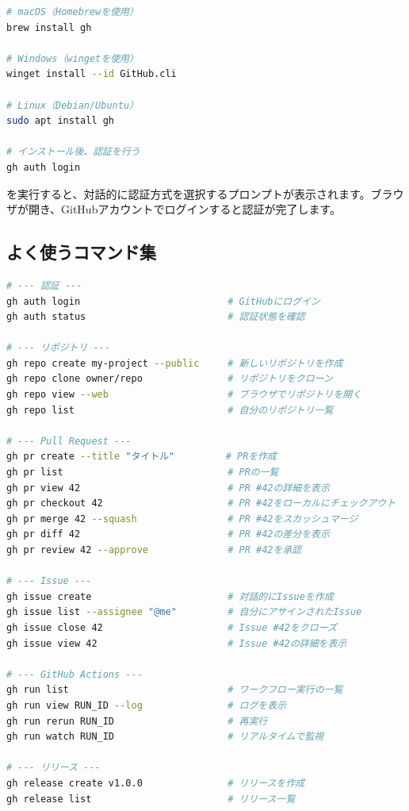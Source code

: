 \begin{lstlisting}[language=bash]
# macOS（Homebrewを使用）
brew install gh

# Windows（wingetを使用）
winget install --id GitHub.cli

# Linux（Debian/Ubuntu）
sudo apt install gh

# インストール後、認証を行う
gh auth login
\end{lstlisting}

 を実行すると、対話的に認証方式を選択するプロンプトが表示されます。ブラウザが開き、GitHubアカウントでログインすると認証が完了します。

\subsection{よく使うコマンド集}

\begin{lstlisting}[language=bash]
# --- 認証 ---
gh auth login                          # GitHubにログイン
gh auth status                         # 認証状態を確認

# --- リポジトリ ---
gh repo create my-project --public     # 新しいリポジトリを作成
gh repo clone owner/repo               # リポジトリをクローン
gh repo view --web                     # ブラウザでリポジトリを開く
gh repo list                           # 自分のリポジトリ一覧

# --- Pull Request ---
gh pr create --title "タイトル"         # PRを作成
gh pr list                             # PRの一覧
gh pr view 42                          # PR #42の詳細を表示
gh pr checkout 42                      # PR #42をローカルにチェックアウト
gh pr merge 42 --squash                # PR #42をスカッシュマージ
gh pr diff 42                          # PR #42の差分を表示
gh pr review 42 --approve              # PR #42を承認

# --- Issue ---
gh issue create                        # 対話的にIssueを作成
gh issue list --assignee "@me"         # 自分にアサインされたIssue
gh issue close 42                      # Issue #42をクローズ
gh issue view 42                       # Issue #42の詳細を表示

# --- GitHub Actions ---
gh run list                            # ワークフロー実行の一覧
gh run view RUN_ID --log               # ログを表示
gh run rerun RUN_ID                    # 再実行
gh run watch RUN_ID                    # リアルタイムで監視

# --- リリース ---
gh release create v1.0.0               # リリースを作成
gh release list                        # リリース一覧
\end{lstlisting}

